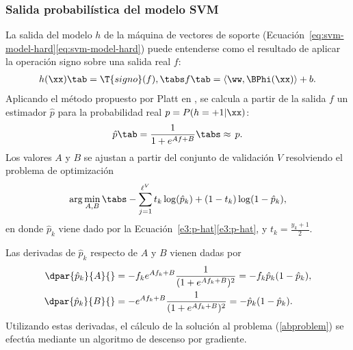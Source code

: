 %
\subsubsection{Salida probabilística del modelo SVM}
%
La salida del modelo $h$ de la máquina de vectores de soporte
(\iflatexml{}Ecuación~\ref{eq:svm-model-hard}\else\autoref{eq:svm-model-hard}\fi)
puede entenderse como el resultado de aplicar la operación signo sobre
una salida real $f$:
%
\begin{align}
\label{e3:svm-model-as-sign-f}
  h(\xx) \tab= \T{signo}(f),\tabs
  f\tab=\langle\ww,\BPhi(\xx)\rangle+b.
\end{align}
%
Aplicando el método propuesto por {Platt} en \cite{platt}, se
calcula a partir de la salida $f$ un estimador
$\hat{p}$ para la probabilidad real $p=P(h=+1|\xx)$:
%
\begin{align}
\label{e3:p-hat}
  \hat{p}\tab=\frac{1}{1+e^{Af+B}} \tabs\approx\,{}p.%
\end{align}
%
Los valores $A$ y $B$ se ajustan a partir del conjunto de
validación $V$ resolviendo el problema de
optimización
%
\begin{align}
  \arg\min_{A,B} \tabs -\sum_{j=1}^{\ell^V} t_k\log(\hat{p}_k)+(1-t_k)\log(1-\hat{p}_k),
  \label{abproblem}
\end{align}
%
en donde $\hat{p}_k$ viene dado por la
\iflatexml{}Ecuación~\ref{e3:p-hat}\else\autoref{e3:p-hat}\fi{}, y
$t_k=\frac{y_k+1}{2}$.
%

Las derivadas de $\hat{p}_k$ respecto de $A$ y $B$ vienen dadas por
%
\begin{align}
  \begin{split}
    \dpar{\hat{p}_k}{A}{}&=-f_k e^{Af_k+B}\frac{1}{(1+e^{Af_k+B})^2}
    =-f_k\hat{p}_k(1-\hat{p}_k),\\
    \dpar{\hat{p}_k}{B}{}&=    -e^{Af_k+B}\frac{1}{(1+e^{Af_k+B})^2}
    =-   \hat{p}_k(1-\hat{p}_k).
  \end{split}
\label{e3:deriv-pk-wrt-AB}
\end{align}
%
Utilizando estas derivadas, el cálculo de la solución al problema
(\ref{abproblem}) se efectúa mediante un algoritmo de descenso por
gradiente.


